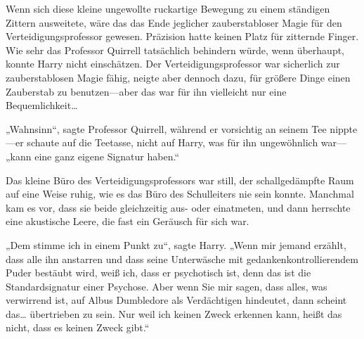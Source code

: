 Wenn sich diese kleine ungewollte ruckartige Bewegung zu einem ständigen Zittern ausweitete, wäre das das Ende jeglicher zauberstabloser Magie für den Verteidigungsprofessor gewesen. Präzision hatte keinen Platz für zitternde Finger. Wie sehr das Professor Quirrell tatsächlich behindern würde, wenn überhaupt, konnte Harry nicht einschätzen. Der Verteidigungsprofessor war sicherlich zur zauberstablosen Magie fähig, neigte aber dennoch dazu, für größere Dinge einen Zauberstab zu benutzen—aber das war für ihn vielleicht nur eine Bequemlichkeit…

„Wahnsinn“, sagte Professor Quirrell, während er vorsichtig an seinem Tee nippte—er schaute auf die Teetasse, nicht auf Harry, was für ihn ungewöhnlich war— „kann eine ganz eigene Signatur haben.“

Das kleine Büro des Verteidigungsprofessors war still, der schallgedämpfte Raum auf eine Weise ruhig, wie es das Büro des Schulleiters nie sein konnte. Manchmal kam es vor, dass sie beide gleichzeitig aus- oder einatmeten, und dann herrschte eine akustische Leere, die fast ein Geräusch für sich war.

„Dem stimme ich in einem Punkt zu“, sagte Harry. „Wenn mir jemand erzählt, dass alle ihn anstarren und dass seine Unterwäsche mit gedankenkontrollierendem Puder bestäubt wird, weiß ich, dass er psychotisch ist, denn das ist die Standardsignatur einer Psychose. Aber wenn Sie mir sagen, dass alles, was verwirrend ist, auf Albus Dumbledore als Verdächtigen hindeutet, dann scheint das… übertrieben zu sein. Nur weil ich keinen Zweck erkennen kann, heißt das nicht, dass es keinen Zweck gibt.“

